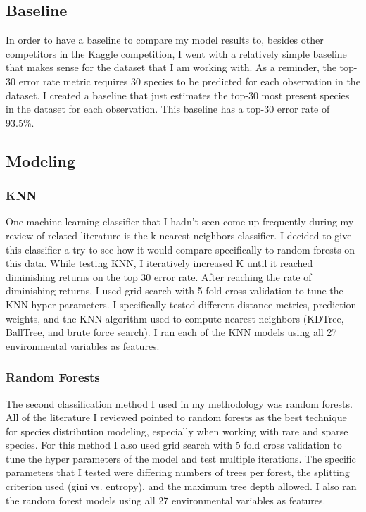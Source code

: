 \documentclass[12pt, oneside]{article}
\begin{document}
\begin{normalsize}
\subsection{Baseline}

In order to have a baseline to compare my model results to, besides other competitors in the Kaggle competition, I went with a relatively simple baseline that makes sense for the dataset that I am working with. As a reminder, the top-30 error rate metric requires 30 species to be predicted for each observation in the dataset. I created a baseline that just estimates the top-30 most present species in the dataset for each observation. This baseline has a top-30 error rate of 93.5\%.

\subsection{Modeling}

\subsubsection{KNN}

One machine learning classifier that I hadn't seen come up frequently during my review of related literature is the k-nearest neighbors classifier. I decided to give this classifier a try to see how it would compare specifically to random forests on this data. While testing KNN, I iteratively increased K until it reached diminishing returns on the top 30 error rate. After reaching the rate of diminishing returns, I used grid search with 5 fold cross validation to tune the KNN hyper parameters. I specifically tested different distance metrics, prediction weights, and the KNN algorithm used to compute nearest neighbors (KDTree, BallTree, and brute force search). I ran each of the KNN models using all 27 environmental variables as features.

\subsubsection{Random Forests}

The second classification method I used in my methodology was random forests. All of the literature I reviewed pointed to random forests as the best technique for species distribution modeling, especially when working with rare and sparse species. For this method I also used grid search with 5 fold cross validation to tune the hyper parameters of the model and test multiple iterations. The specific parameters that I tested were differing numbers of trees per forest, the splitting criterion used (gini vs. entropy), and the maximum tree depth allowed. I also ran the random forest models using all 27 environmental variables as features.


\end{normalsize}
\end{document}
